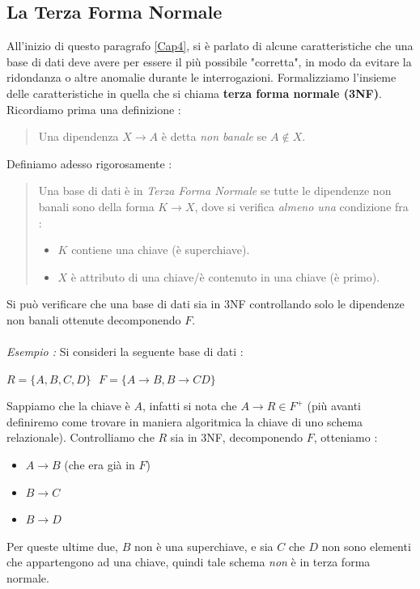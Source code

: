 \documentclass[12pt, letterpaper]{article}
\begin{document}
\subsection{La Terza Forma Normale}
All'inizio di questo paragrafo \ref{Cap4}, si è parlato di alcune caratteristiche che una base di dati deve avere per essere 
il più possibile "corretta", in modo da evitare la ridondanza o altre anomalie durante le interrogazioni. Formalizziamo 
l'insieme delle caratteristiche in quella che si chiama \textbf{terza forma normale (3NF)}. Ricordiamo prima una definizione :
\begin{quote}
    Una dipendenza \(X\rightarrow A\) è detta \textit{non banale} se \(A\notin X\).
\end{quote} 
Definiamo adesso rigorosamente : \begin{quote}
    Una base di dati è in \textit{Terza Forma Normale} se tutte le dipendenze non banali sono
     della forma \(K\rightarrow X\), dove si verifica \textit{almeno una} condizione fra :\begin{itemize}
        \item \(K\) contiene una chiave (è superchiave).
        \item \(X\) è attributo di una chiave/è contenuto in una chiave (è primo).
    \end{itemize}
\end{quote}
Si può verificare che una base di dati sia in 3NF controllando solo le dipendenze non banali ottenute decomponendo \(F\).
\\\hphantom{}\\\textit{Esempio : } Si consideri la seguente base di dati :\begin{center}
    \(R=\{A,B,C,D\}\text{ }F=\{A\rightarrow B, B\rightarrow CD\}\)
\end{center}
Sappiamo che la chiave è \(A\), infatti si nota che \(A\rightarrow R \in F^+\) (più avanti definiremo come trovare in maniera 
algoritmica la chiave di uno schema relazionale).
Controlliamo che \(R\) sia in 3NF, decomponendo \(F\), otteniamo :\begin{itemize}
    \item \(A\rightarrow B\) (che era già in \(F\))
    \item \(B\rightarrow C\)
    \item \(B\rightarrow D\)
\end{itemize}
Per queste ultime due, \(B\) non è una superchiave, e sia \(C\) che \(D\) non sono elementi che appartengono ad una chiave, 
quindi tale schema \textit{non} è in terza forma normale.
\end{document}

